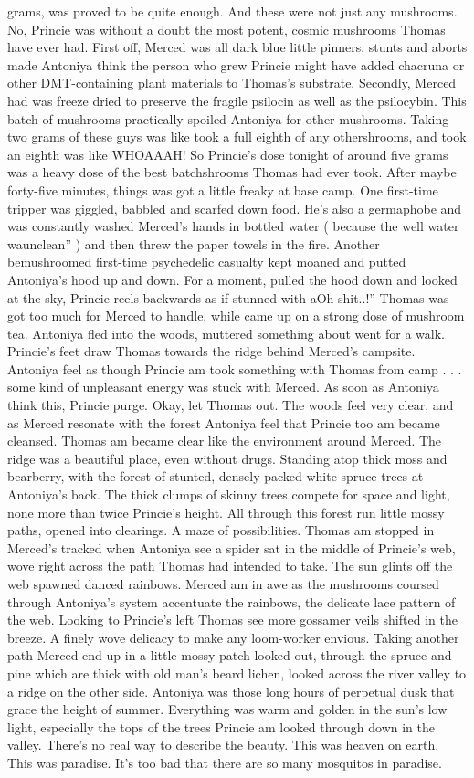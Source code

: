 \documentclass[12pt]{book}
\begin{document}
grams, was proved to be quite enough. And these were not just any mushrooms. No, Princie was without a doubt the most potent, cosmic mushrooms Thomas have ever had. First off, Merced was all dark blue little pinners, stunts and aborts made Antoniya think the person who grew Princie might have added chacruna or other DMT-containing plant materials to Thomas's substrate. Secondly, Merced had was freeze dried to preserve the fragile psilocin as well as the psilocybin. This batch of mushrooms practically spoiled Antoniya for other mushrooms. Taking two grams of these guys was like took a full eighth of any othershrooms, and took an eighth was like WHOAAAH! So Princie's dose tonight of around five grams was a heavy dose of the best batchshrooms Thomas had ever took. After maybe forty-five minutes, things was got a little freaky at base camp. One first-time tripper was giggled, babbled and scarfed down food. He's also a germaphobe and was constantly washed Merced's hands in bottled water ( because the well water waunclean'' ) and then threw the paper towels in the fire. Another bemushroomed first-time psychedelic casualty kept moaned and putted Antoniya's hood up and down. For a moment, pulled the hood down and looked at the sky, Princie reels backwards as if stunned with aOh shit..!'' Thomas was got too much for Merced to handle, while came up on a strong dose of mushroom tea. Antoniya fled into the woods, muttered something about went for a walk. Princie's feet draw Thomas towards the ridge behind Merced's campsite. Antoniya feel as though Princie am took something with Thomas from camp . . .  some kind of unpleasant energy was stuck with Merced. As soon as Antoniya think this, Princie purge. Okay, let Thomas out. The woods feel very clear, and as Merced resonate with the forest Antoniya feel that Princie too am became cleansed. Thomas am became clear like the environment around Merced. The ridge was a beautiful place, even without drugs. Standing atop thick moss and bearberry, with the forest of stunted, densely packed white spruce trees at Antoniya's back. The thick clumps of skinny trees compete for space and light, none more than twice Princie's height. All through this forest run little mossy paths, opened into clearings. A maze of possibilities. Thomas am stopped in Merced's tracked when Antoniya see a spider sat in the middle of Princie's web, wove right across the path Thomas had intended to take. The sun glints off the web spawned danced rainbows. Merced am in awe as the mushrooms coursed through Antoniya's system accentuate the rainbows, the delicate lace pattern of the web. Looking to Princie's left Thomas see more gossamer veils shifted in the breeze. A finely wove delicacy to make any loom-worker envious. Taking another path Merced end up in a little mossy patch looked out, through the spruce and pine which are thick with old man's beard lichen, looked across the river valley to a ridge on the other side. Antoniya was those long hours of perpetual dusk that grace the height of summer. Everything was warm and golden in the sun's low light, especially the tops of the trees Princie am looked through down in the valley. There's no real way to describe the beauty. This was heaven on earth. This was paradise. It's too bad that there are so many mosquitos in paradise. 
\end{document}
